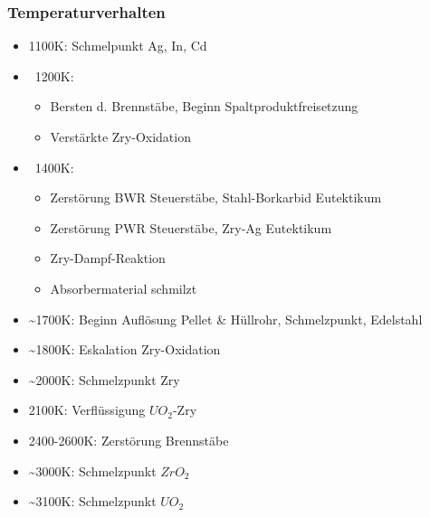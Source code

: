 \documentclass[12pt]{article}
\begin{document}
\subsubsection{Temperaturverhalten}
\begin{itemize}[noitemsep]
	\item 1100K: Schmelpunkt Ag, In, Cd
	\item ~1200K:
		\begin{itemize}[noitemsep]
			\item Bersten d. Brennstäbe, Beginn Spaltproduktfreisetzung
			\item Verstärkte Zry-Oxidation
		\end{itemize}
	\item ~1400K:
		\begin{itemize}[noitemsep]
			\item Zerstörung BWR Steuerstäbe, Stahl-Borkarbid Eutektikum
			\item Zerstörung PWR Steuerstäbe, Zry-Ag Eutektikum
			\item Zry-Dampf-Reaktion
			\item Absorbermaterial schmilzt
		\end{itemize}
	\item \textasciitilde 1700K: Beginn Auflösung Pellet \& Hüllrohr, Schmelzpunkt, Edelstahl
	\item \textasciitilde 1800K: Eskalation Zry-Oxidation
	\item \textasciitilde 2000K: Schmelzpunkt Zry
	\item 2100K: Verflüssigung \(UO_2\)-Zry
	\item 2400-2600K: Zerstörung Brennstäbe
	\item \textasciitilde 3000K: Schmelzpunkt \(ZrO_2\)
	\item \textasciitilde 3100K: Schmelzpunkt \(UO_2\)
\end{itemize}
\end{document}

